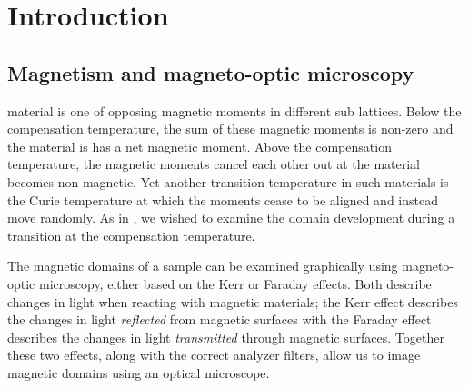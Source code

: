 \documentclass[journal]{IEEEtran}
\begin{document}
%
\IEEEpeerreviewmaketitle



\section{Introduction}

\subsection{Magnetism and magneto-optic microscopy}
 material is one of opposing magnetic moments in different sub lattices. Below the compensation temperature, the sum of these magnetic moments is non-zero and the material is has a net magnetic moment. Above the compensation temperature, the magnetic moments cancel each other out at the material becomes non-magnetic. Yet another transition temperature in such materials is the Curie temperature at which the moments cease to be aligned and instead move randomly. As in \cite{garnet}, we wished to examine the domain development during a transition at the compensation temperature.

The magnetic domains of a sample can be examined graphically using magneto-optic microscopy, either based on the Kerr or Faraday effects. Both describe changes in light when reacting with magnetic materials; the Kerr effect describes the changes in light \emph{reflected} from magnetic surfaces with the Faraday effect describes the changes in light \emph{transmitted} through magnetic surfaces. Together these two effects, along with the correct analyzer filters, allow us to image magnetic domains using an optical microscope.
\end{document}

